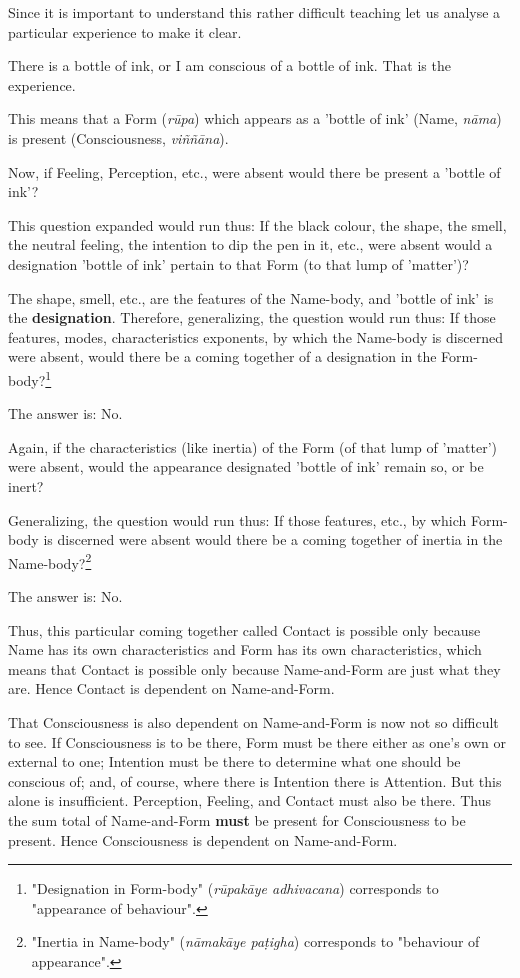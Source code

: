 Since it is important to understand this rather difficult teaching let
us analyse a particular experience to make it clear.


There is a bottle of ink, or I am conscious of a bottle of ink. That is
the experience.


This means that a Form (\emph{rūpa}) which appears as a 'bottle of ink'
(Name, \emph{nāma}) is present (Consciousness, \emph{viññāna}).


Now, if Feeling, Perception, etc., were absent would there be present a
'bottle of ink'?


This question expanded would run thus: If the black colour, the shape,
the smell, the neutral feeling, the intention to dip the pen in it,
etc., were absent would a designation 'bottle of ink' pertain to that
Form (to that lump of 'matter')?


The shape, smell, etc., are the features of the Name-body, and 'bottle
of ink' is the \textbf{designation}. Therefore, generalizing, the question
would run thus: If those features, modes, characteristics exponents, by
which the Name-body is discerned were absent, would there be a coming
together of a designation in the Form-body?\footnote{"Designation in Form-body" (\emph{rūpakāye adhivacana}) corresponds to "appearance of behaviour".}


The answer is: No.


Again, if the characteristics (like inertia) of the Form (of that lump
of 'matter') were absent, would the appearance designated 'bottle of
ink' remain so, or be inert?


Generalizing, the question would run thus: If those features, etc., by
which Form-body is discerned were absent would there be a coming
together of inertia in the Name-body?\footnote{"Inertia in Name-body" (\emph{nāmakāye paṭigha}) corresponds to "behaviour of appearance".}


The answer is: No.


Thus, this particular coming together called Contact is possible only
because Name has its own characteristics and Form has its own
characteristics, which means that Contact is possible only because
Name-and-Form are just what they are. Hence Contact is dependent on
Name-and-Form.


That Consciousness is also dependent on Name-and-Form is now not so
difficult to see. If Consciousness is to be there, Form must be there
either as one’s own or external to one; Intention must be there to
determine what one should be conscious of; and, of course, where there
is Intention there is Attention. But this alone is insufficient.
Perception, Feeling, and Contact must also be there. Thus the sum total
of Name-and-Form \textbf{must} be present for Consciousness to be present.
Hence Consciousness is dependent on Name-and-Form.


